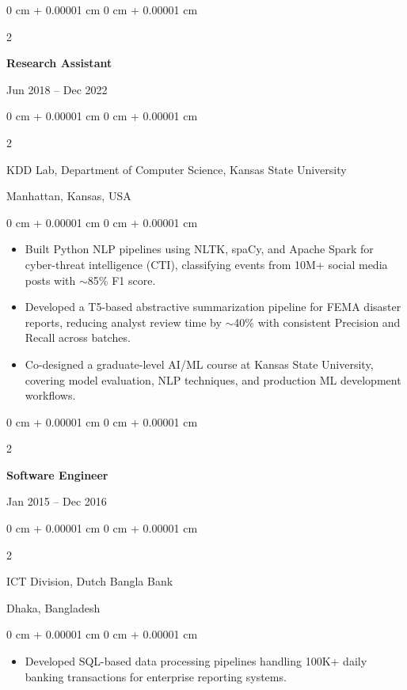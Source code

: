 \documentclass[10pt, letterpaper]{article}
\newenvironment{highlights}{
    \begin{itemize}[
        topsep=0.10 cm,
        parsep=0.10 cm,
        partopsep=0pt,
        itemsep=0pt,
        leftmargin=0 cm + 10pt
    ]
}{
    \end{itemize}
} %
\newenvironment{onecolentry}{
    \begin{adjustwidth}{
        0 cm + 0.00001 cm
    }{
        0 cm + 0.00001 cm
    }
}{
    \end{adjustwidth}
} %
\newenvironment{twocolentry}[2][]{
    \onecolentry
    \def\secondColumn{#2}
    \setcolumnwidth{\fill, 4.5 cm}
    \begin{paracol}{2}
}{
    \switchcolumn \raggedleft \secondColumn
    \end{paracol}
    \endonecolentry
} %
\begin{document}
    \vspace{1mm}

    \begin{twocolentry}{Jun 2018 -- Dec 2022}
        \textbf{Research Assistant}
    \end{twocolentry}
    \begin{twocolentry}{Manhattan, Kansas, USA}
       KDD Lab, Department of Computer Science, Kansas State University
    \end{twocolentry}
    \vspace{0.10 cm}
    \begin{onecolentry}
        \begin{highlights}
            \item Built Python NLP pipelines using NLTK, spaCy, and Apache Spark for cyber-threat intelligence (CTI), classifying events from 10M+ social media posts with $\sim$85\% F1 score.
            \item Developed a T5-based abstractive summarization pipeline for FEMA disaster reports, reducing analyst review time by $\sim$40\% with consistent Precision and Recall across batches.
            \item Co-designed a graduate-level AI/ML course at Kansas State University, covering model evaluation, NLP techniques, and production ML development workflows.
        \end{highlights}
    \end{onecolentry}

    \vspace{0.1 cm}
    \begin{twocolentry}{Jan 2015 -- Dec 2016}
        \textbf{Software Engineer}
    \end{twocolentry}
    \begin{twocolentry}{Dhaka, Bangladesh}
       ICT Division, Dutch Bangla Bank
    \end{twocolentry}

    \begin{onecolentry}
        \begin{highlights}
            \item Developed SQL-based data processing pipelines handling 100K+ daily banking transactions for enterprise reporting systems.
        \end{highlights}
    \end{onecolentry}

\vspace{-1.5mm}
\end{document}
